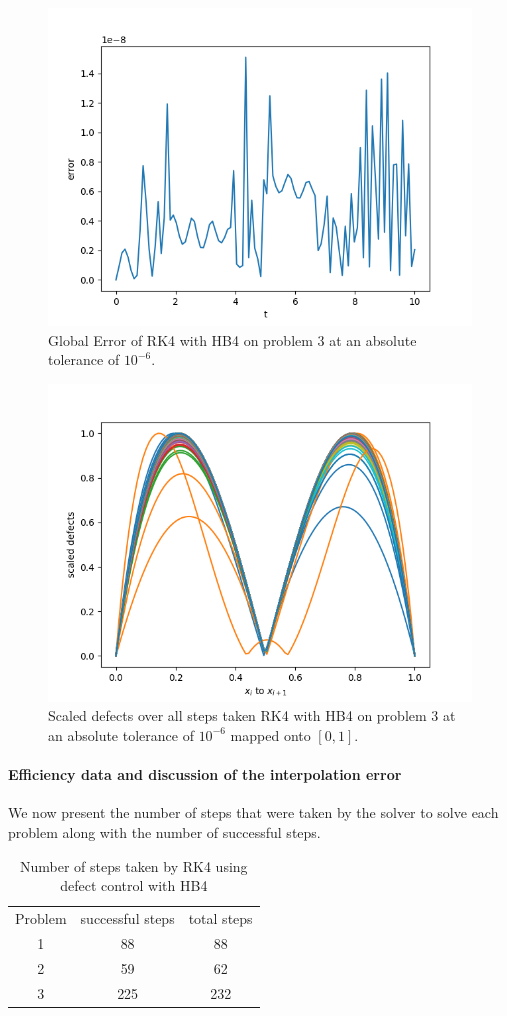 \documentclass{article}
\begin{document}
\begin{figure}[H]
\centering
\includegraphics[width=0.7\linewidth]{./figures/rk4_with_hb4_p3_global_error}
\caption{Global Error of RK4 with HB4 on problem 3 at an absolute tolerance of $10^{-6}$.}
\label{fig:rk4_with_hb4_p3_global_error}
\end{figure}

\begin{figure}[H]
\centering
\includegraphics[width=0.7\linewidth]{./figures/rk4_with_hb4_p3_scaled_defects}
\caption{Scaled defects over all steps taken RK4 with HB4 on problem 3 at an absolute tolerance of $10^{-6}$ mapped onto $[0, 1]$.}
\label{fig:rk4_with_hb4_p3_scaled_defects}
\end{figure}

\paragraph{Efficiency data and discussion of the interpolation error}
We now present the number of steps that were taken by the solver to solve each problem along with the number of successful steps.

\begin{table}[h]
\caption {Number of steps taken by RK4 using defect control with HB4} \label{tab:rk4_with_hb4_nsteps}
\begin{center}
\begin{tabular}{ c c c } 
Problem & successful steps & total steps \\ 
1       & 88                         & 88 \\ 
2       & 59                         & 62 \\
3       & 225                        & 232 \\
\end{tabular}
\end{center}
\end{table}
\end{document}
